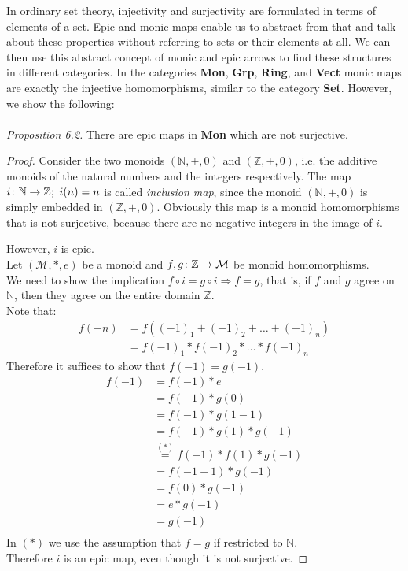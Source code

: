 \newpage
In ordinary set theory, injectivity and surjectivity are formulated in terms of elements of a set.
Epic and monic maps enable us to abstract from that and
talk about these properties without referring to sets or their elements at all.
We can then use this abstract concept of monic and epic arrows to find these structures
in different categories.
In the categories \textbf{Mon}, \textbf{Grp}, \textbf{Ring}, and \textbf{Vect}
monic maps are exactly the injective homomorphisms,
similar to the category \textbf{Set}.
However, we show the following: \\
\\\textit{Proposition 6.2.} There are epic maps in \textbf{Mon} which are not surjective.
\begin{proof}
  Consider the two monoids $(\mathbb{N}, +, 0)$ and $(\mathbb{Z}, +, 0)$, i.e. the
  additive monoids of the natural numbers and the integers respectively.
  The map $i \from \mathbb{N} \to \mathbb{Z}; \ i(n) = n$ is called \emph{inclusion map},
  since the monoid $(\mathbb{N}, +, 0)$ is simply embedded in $(\mathbb{Z}, +, 0)$.
  Obviously this map is a monoid homomorphisms that is not surjective,
  because there are no negative integers in the image of $i$.

  However, $i$ is epic.\\
  Let $(\mathcal{M}, *, e)$ be a monoid and $f, g \from \mathbb{Z} \to \mathcal{M}$ be
  monoid homomorphisms.\\

  We need to show the implication $f \circ i = g \circ i \Rightarrow f = g$, that is,
  if $f$ and $g$ agree on $\mathbb{N}$, then they agree on the entire domain $\mathbb{Z}$.\\
  Note that:
  \begin{align*}
    f(-n) &= f ((-1)_1 + (-1)_2 + \dots + (-1)_n)\\
          &= f(-1)_1 * f(-1)_2 * \dots * f(-1)_n
  \end{align*}
  Therefore it suffices to show that $f(-1) = g(-1)$.
  \begin{align*}
    f(-1) &= f(-1) * e \\
          &= f(-1) * g(0) \\
          &= f(-1) * g(1 - 1) \\
          &= f(-1) * g(1) * g(-1) \\
          &\overset{(*)}{=} f(-1) * f(1) * g(-1) \\
          &= f(-1 + 1) * g(-1) \\
          &= f(0) * g(-1) \\
          &= e * g(-1) \\
          &= g(-1) \\ 
  \end{align*}
  In $(*)$ we use the assumption that $f=g$ if restricted to $\mathbb{N}$.\\
  Therefore $i$ is an epic map, even though it is not surjective.
\end{proof}


